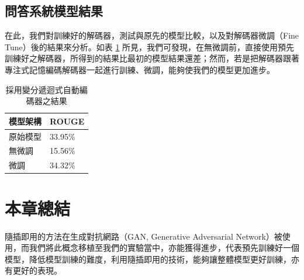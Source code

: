 \subsection{問答系統模型結果}
在此，我們對訓練好的解碼器，測試與原先的模型比較，以及對解碼器微調（Fine Tune）後的結果來分析。如表 \ref{table:vrae} 所見，我們可發現，在無微調前，直接使用預先訓練好之解碼器，所得到的結果比最初的模型結果還差；然而，若是把解碼器跟著專注式記憶編碼解碼器一起進行訓練、微調，能夠使我們的模型更加進步。%
\begin{table}[ht]
    \caption{採用變分遞迴式自動編碼器之結果} 
    \label{table:vrae}
    \centering
    \begin{tabular}{|l|l|}
        \hline
        模型架構 & ROUGE\\
        \hline
        原始模型 & 33.95\%\\
        \hline
        無微調 & 15.56\%\\%
        \hline
        微調 & 34.32\%\\%
        \hline
    \end{tabular}
\end{table}
\section{本章總結}
隨插即用的方法在生成對抗網路（GAN, Generative Adversarial Network）被使用，而我們將此概念移植至我們的實驗當中，亦能獲得進步，代表預先訓練好一個模型，降低模型訓練的難度，利用隨插即用的技術，能夠讓整體模型更好訓練，亦有更好的表現。%
